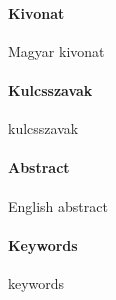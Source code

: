 \begin{otherlanguage}{magyar}
  \paragraph*{Kivonat}
  \thispagestyle{plain}

  Magyar kivonat

  \paragraph{Kulcsszavak} kulcsszavak
\end{otherlanguage}

\cleardoublepage

\paragraph*{Abstract}
{}
\thispagestyle{plain}

English abstract

\paragraph{Keywords} keywords
